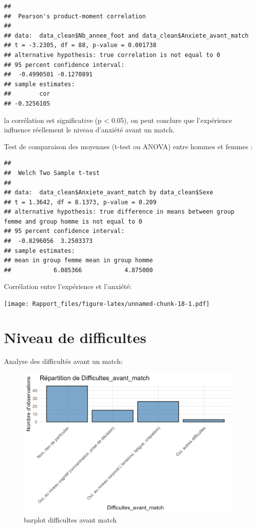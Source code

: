 \documentclass[
]{article}
\begin{document}
\begin{verbatim}
## 
##  Pearson's product-moment correlation
## 
## data:  data_clean$Nb_annee_foot and data_clean$Anxiete_avant_match
## t = -3.2305, df = 88, p-value = 0.001738
## alternative hypothesis: true correlation is not equal to 0
## 95 percent confidence interval:
##  -0.4990501 -0.1270891
## sample estimates:
##        cor 
## -0.3256105
\end{verbatim}

la corrélation est significative (p \textless{} 0.05), on peut conclure
que l'expérience influence réellement le niveau d'anxiété avant un
match.

Test de comparaison des moyennes (t-test ou ANOVA) entre hommes et
femmes :

\begin{verbatim}
## 
##  Welch Two Sample t-test
## 
## data:  data_clean$Anxiete_avant_match by data_clean$Sexe
## t = 1.3642, df = 8.1373, p-value = 0.209
## alternative hypothesis: true difference in means between group femme and group homme is not equal to 0
## 95 percent confidence interval:
##  -0.8296056  3.2503373
## sample estimates:
## mean in group femme mean in group homme 
##            6.085366            4.875000
\end{verbatim}

Corrélation entre l'expérience et l'anxiété:

\texttt{[image: Rapport\_files/figure-latex/unnamed-chunk-18-1.pdf]}

\section{Niveau de difficultes}\label{niveau-de-difficultes}

Analyse des difficultés avant un match:

\begin{figure}
\centering
\includegraphics{Image/barplot_Difficultes_avant_match.png}
\caption{barplot difficultes avant match}
\end{figure}
\end{document}
